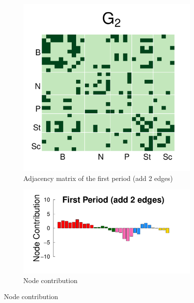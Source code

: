 \documentclass[12pt]{article}
\begin{document}
\begin{figure}[H]
	\centering
	\begin{subfigure}[b]{0.3\textwidth}
		\includegraphics[width=\textwidth]{../../Figure/sim_Adj2.pdf}
		\caption{Adjacency matrix of the first period (add 2 edges)}
		\label{fig:step2}
	\end{subfigure}
	\begin{subfigure}[b]{0.6\textwidth}
		\includegraphics[width=\textwidth]{../../Figure/step2.pdf}
		\caption{Node contribution}
		\label{fig:adj.step2}
	\end{subfigure}
\end{figure}
\end{document}
